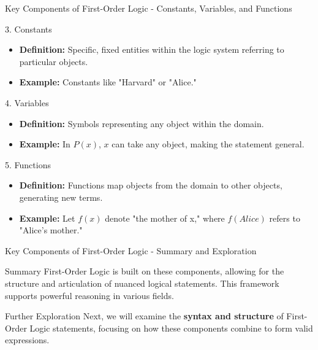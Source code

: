 \documentclass[aspectratio=169]{beamer}
\begin{document}
\begin{frame}[fragile]{Key Components of First-Order Logic - Constants, Variables, and Functions}
    \begin{block}{3. Constants}
        \begin{itemize}
            \item \textbf{Definition:} Specific, fixed entities within the logic system referring to particular objects.
            \item \textbf{Example:} Constants like "Harvard" or "Alice."
        \end{itemize}
    \end{block}

    \begin{block}{4. Variables}
        \begin{itemize}
            \item \textbf{Definition:} Symbols representing any object within the domain.
            \item \textbf{Example:} In \( P(x) \), \( x \) can take any object, making the statement general.
        \end{itemize}
    \end{block}

    \begin{block}{5. Functions}
        \begin{itemize}
            \item \textbf{Definition:} Functions map objects from the domain to other objects, generating new terms.
            \item \textbf{Example:} Let \( f(x) \) denote "the mother of x," where \( f(Alice) \) refers to "Alice's mother."
        \end{itemize}
    \end{block}
\end{frame}

\begin{frame}[fragile]{Key Components of First-Order Logic - Summary and Exploration}
    \begin{block}{Summary}
        First-Order Logic is built on these components, allowing for the structure and articulation of nuanced logical statements. This framework supports powerful reasoning in various fields.
    \end{block}

    \begin{block}{Further Exploration}
        Next, we will examine the \textbf{syntax and structure} of First-Order Logic statements, focusing on how these components combine to form valid expressions.
    \end{block}
\end{frame}
\end{document}
